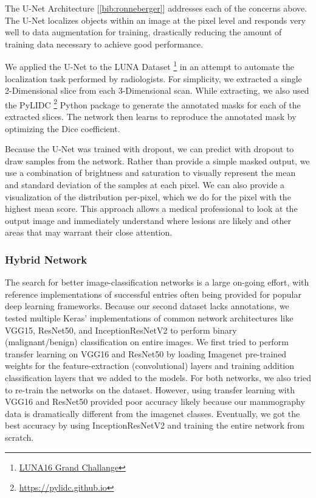 \documentclass[12pt]{article}
\begin{document}
{The U-Net Architecture [\ref{bib:ronneberger}] addresses each of the concerns above. The U-Net localizes objects within an image at the pixel level and responds very well to data augmentation for training, drastically reducing the amount of training data necessary to achieve good performance.

We applied the U-Net to the LUNA Dataset \footnote{\href{http://luna16.grand-challenge.org}{LUNA16 Grand Challange}} in an attempt to automate the localization task performed by radiologists. For simplicity, we extracted a single 2-Dimensional slice from each 3-Dimensional scan. While extracting, we also used the PyLIDC \footnote{\href{https://pylidc.github.io}{https://pylidc.github.io}} Python package to generate the annotated masks for each of the extracted slices. The network then learns to reproduce the annotated mask by optimizing the Dice coefficient.

Because the U-Net was trained with dropout, we can predict with dropout to draw samples from the network. Rather than provide a simple masked output, we use a combination of brightness and saturation to visually represent the mean and standard deviation of the samples at each pixel. We can also provide a visualization of the distribution per-pixel, which we do for the pixel with the highest mean score. This approach allows a medical professional to look at the output image and immediately understand where lesions are likely and other areas that may warrant their close attention.

\subsubsection*{Hybrid Network}
The search for better image-classification networks is a large on-going effort, with reference implementations of successful entries often being provided for popular deep learning frameworks. Because our second dataset lacks annotations, we tested multiple Keras' implementations of common network architectures like VGG15, ResNet50, and InceptionResNetV2 to perform binary (malignant/benign) classification on entire images. We first tried to perform transfer learning on VGG16 and ResNet50 by loading Imagenet pre-trained weights for the feature-extraction (convolutional) layers and training addition classification layers that we added to the models. For both networks, we also tried to re-train the networks on the dataset. However, using transfer learning with VGG16 and ResNet50 provided poor accuracy likely because our mammography data is dramatically different from the imagenet classes. Eventually, we got the best accuracy by using InceptionResNetV2 and training the entire network from scratch.

}
\end{document}

